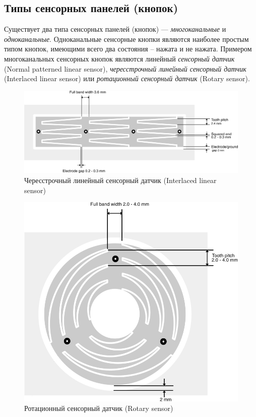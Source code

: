 \subsection{Типы сенсорных панелей (кнопок)}
Существует два типа сенсорных панелей (кнопок) --- \textit{многоканальные} и \textit{одноканальные}. Одноканальные сенсорные кнопки являются наиболее простым типом кнопок, имеющими всего два состояния -- нажата и не нажата. Примером многоканальных сенсорных кнопок являются линейный \textit{сенсорный датчик} (Normal patterned linear sensor), \textit{чересстрочный линейный сенсорный датчик} (Interlaced linear sensor) или \textit{ротационный сенсорный датчик} (Rotary sensor).
\begin{figure}[H]
\begin{center}
\includegraphics[scale=0.25]{Image/59.jpg} 
\end{center}
\caption{Чересстрочный линейный сенсорный датчик (Interlaced linear sensor)}
\end{figure}

\begin{figure}[H]
\begin{center}
\includegraphics[scale=0.25]{Image/60.jpg} 
\end{center}
\caption{Ротационный сенсорный датчик (Rotary sensor)}
\end{figure}

